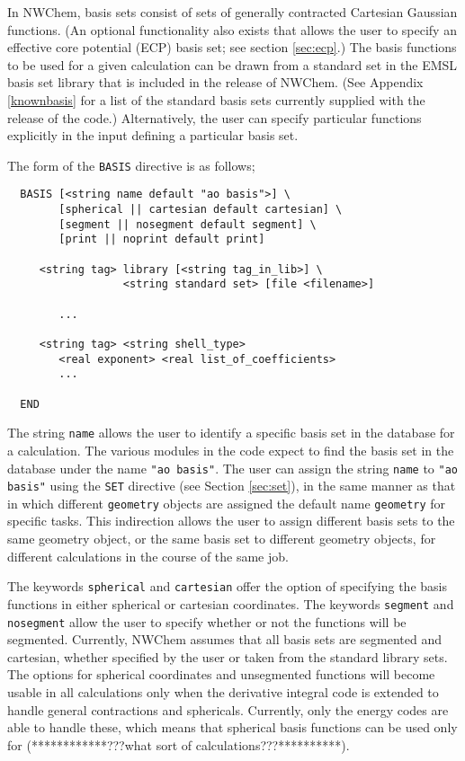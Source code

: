 \label{sec:basis}
In NWChem, basis sets consist of sets of generally contracted Cartesian
Gaussian functions.  (An optional functionality also exists that allows the
user to specify an effective core potential (ECP) basis set; see
section \ref{sec:ecp}.)  The basis functions to be used for a given
calculation can be drawn from a standard set in the EMSL basis set library
that is included in the release of NWChem.  (See Appendix \ref{knownbasis} 
for a list of the standard basis sets currently supplied with the release 
of the code.)    Alternatively, the user can specify particular functions
explicitly in the input defining a particular basis set.  

The form of the \verb+BASIS+ directive is as follows;

\begin{verbatim}
  BASIS [<string name default "ao basis">] \
        [spherical || cartesian default cartesian] \
        [segment || nosegment default segment] \
        [print || noprint default print]

     <string tag> library [<string tag_in_lib>] \
                  <string standard set> [file <filename>]

        ...

     <string tag> <string shell_type>
        <real exponent> <real list_of_coefficients>
        ...
     
  END
\end{verbatim}    

The string \verb+name+ allows the user to identify a specific basis set
in the database for a calculation.  The various modules in the code expect 
to find the
basis set in the database under the name \verb+"ao basis"+.  The user can
assign the string \verb+name+ to \verb+"ao basis"+ using the \verb+SET+
directive (see Section \ref{sec:set}), in the same manner as that in
which different 
\verb+geometry+ objects are assigned the default name \verb+geometry+ 
for specific tasks.  This indirection allows the user to assign different
basis sets to the same geometry object, or the same basis set to different
geometry objects, for different calculations in
the course of the same job.

The keywords \verb+spherical+ and \verb+cartesian+ offer the option of
specifying the basis functions in either spherical or cartesian coordinates.
The keywords \verb+segment+ and \verb+nosegment+ allow the user to specify
whether or not the functions will be segmented.  Currently, NWChem assumes
that all basis sets are segmented  and cartesian, whether specified by the 
user or taken from the standard library sets.
The options for spherical coordinates and unsegmented functions will become
usable in all calculations only when the derivative integral code is 
extended to handle 
general contractions and sphericals.  Currently, only the energy codes are
able to handle these, which means that spherical basis functions can be used
only for (************???what sort of calculations???**********).

